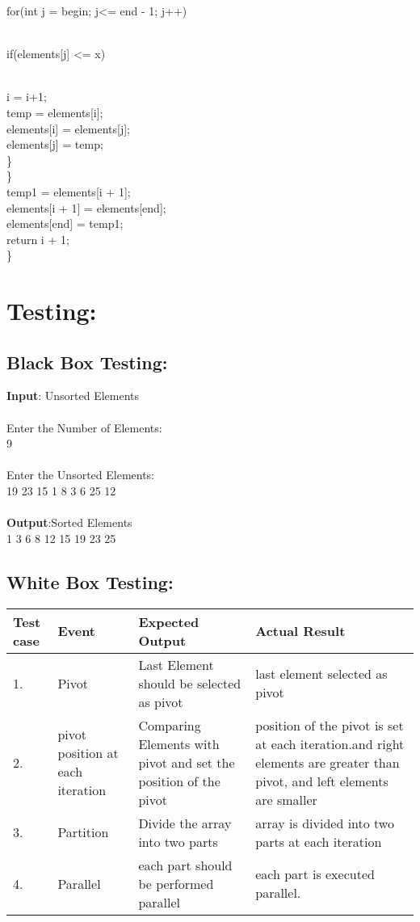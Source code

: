 \documentclass{article}
\begin{document}
	for(int j = begin; j<= end - 1; j++) {\\
		if(elements[j] <= x) {\\
			i = i+1;\\
			temp = elements[i];\\
			elements[i] = elements[j];\\
			elements[j] = temp;\\
			\}\\
			\}\\
			temp1 = elements[i + 1];\\
			elements[i + 1] = elements[end];\\
			elements[end] = temp1;\\
			return i + 1;\\
			\}\\
			
			
			\section{Testing:}
			\subsection{Black Box Testing:}
			\textbf{Input}: Unsorted Elements\\\\
			Enter the Number of Elements:\\
			9\\\\
			Enter the Unsorted Elements:\\
			19 23 15 1 8 3 6 25 12\\\\
			\textbf{Output}:Sorted Elements\\
			1 3 6 8 12 15 19 23 25
			
			\subsection{White Box Testing:}
			
			\begin{tabular}{|p{1 cm}|p{2 cm}|p{3 cm}|p{3 cm}|} 
				\hline
				Test case & Event & Expected Output & Actual Result \\ 
				\hline\hline
				1. & Pivot & Last Element should be selected as pivot & last element selected as pivot \\ 
				\hline
				2. &pivot position at each iteration & Comparing Elements with pivot and set the position of the pivot & position of the pivot is set at each iteration.and right elements are greater than pivot, and left elements are smaller\\
				\hline
				3. & Partition & Divide the array into two parts & array is divided into two parts at each iteration\\
				\hline
				4. & Parallel & each part should be performed parallel & each part is executed parallel.\\
				

\end{tabular}}}
\end{document}
